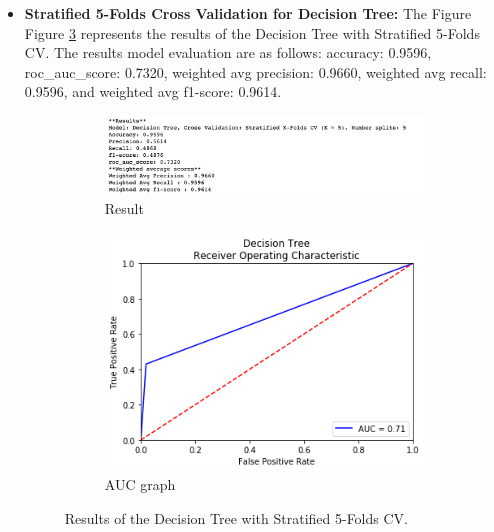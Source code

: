 \documentclass[11pt]{article}
\begin{document}
\begin{itemize}
\item \textbf{Stratified 5-Folds Cross Validation for Decision Tree:}
The Figure 
Figure \ref{fig:dtree_cv} represents the results of the Decision Tree with Stratified 5-Folds CV.%
%
The results model evaluation are as follows:
accuracy: 0.9596,
roc\_auc\_score: 0.7320,
weighted avg precision: 0.9660,
weighted avg recall: 0.9596, and
weighted avg f1-score: 0.9614.

\begin{figure}[h!]
\centering
\begin{subfigure}{0.6\textwidth}
         \centering
         \includegraphics[width=\textwidth]{dtree_cv.png}
         \caption{Result}
         \label{fig:dtree_cv_report}
\end{subfigure}
\hfill
\begin{subfigure}{0.38\textwidth}
         \centering
         \includegraphics[width=\textwidth]{dtree_cv_auc.png}
         \caption{AUC graph}
         \label{fig:dtree_cv_auc}
\end{subfigure}
\caption{Results of the Decision Tree with Stratified 5-Folds CV.}
\label{fig:dtree_cv}
\end{figure}
\end{itemize}
\end{document}
